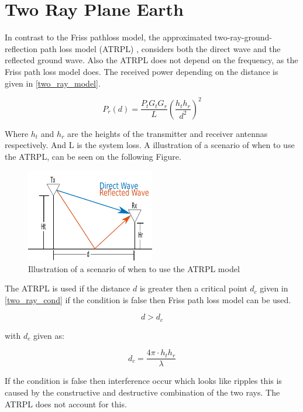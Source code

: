 \section{Two Ray Plane Earth}
In contrast to the Friss pathloss model, the approximated two-ray-ground-reflection path loss model (ATRPL) \citep{two_ray}, considers both the direct wave and the reflected ground wave. Also the ATRPL does not depend on the frequency, as the Friss path loss model does. The received power depending on the distance is given in \eqref{two_ray_model}.

\begin{equation}
P_r(d) = \frac{P_t G_t G_r}{L} \left(\frac{h_t h_r}{d^2}\right)^2
\label{two_ray_model}
\end{equation}

Where $h_t$ and $h_r$ are the heights of the transmitter and receiver antennas respectively. And L is the system loss. A illustration of a scenario of when to use the ATRPL, can be seen on the following Figure.

\begin{figure}[H]
\centering
\includegraphics[width=0.5\textwidth]{Figures/two_ray_illu.pdf}
\caption{Illustration of a scenario of when to use the ATRPL model}
\label{two_ray_scena}
\end{figure}


The ATRPL is used if the distance $d$ is greater then a critical point $d_{c}$ given in \eqref{two_ray_cond} if the condition is false then Friss path loss model can be used. 

\begin{equation}
d>d_{c}
\label{two_ray_cond}
\end{equation}

with $d_{c}$ given as:

\begin{equation}
d_{c} = \frac{4\pi \cdot h_t h_r}{\lambda}
\label{critical_fac_dc}
\end{equation}

If the condition is false then interference occur which looks like ripples this is caused by the constructive and destructive combination of the two rays. The ATRPL does not account for this.  

